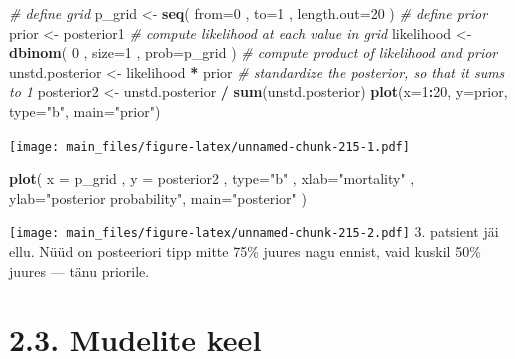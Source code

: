 \documentclass[]{book}
\newenvironment{Shaded}{\begin{snugshade}}{\end{snugshade}}
\newcommand{\KeywordTok}[1]{\textcolor[rgb]{0.13,0.29,0.53}{\textbf{#1}}}
\newcommand{\DataTypeTok}[1]{\textcolor[rgb]{0.13,0.29,0.53}{#1}}
\newcommand{\DecValTok}[1]{\textcolor[rgb]{0.00,0.00,0.81}{#1}}
\newcommand{\StringTok}[1]{\textcolor[rgb]{0.31,0.60,0.02}{#1}}
\newcommand{\CommentTok}[1]{\textcolor[rgb]{0.56,0.35,0.01}{\textit{#1}}}
\newcommand{\OperatorTok}[1]{\textcolor[rgb]{0.81,0.36,0.00}{\textbf{#1}}}
\newcommand{\NormalTok}[1]{#1}
\begin{document}
\begin{Shaded}
\begin{Highlighting}[]
\CommentTok{# define grid}
\NormalTok{p_grid <-}\StringTok{ }\KeywordTok{seq}\NormalTok{( }\DataTypeTok{from=}\DecValTok{0}\NormalTok{ , }\DataTypeTok{to=}\DecValTok{1}\NormalTok{ , }\DataTypeTok{length.out=}\DecValTok{20}\NormalTok{ )}
\CommentTok{# define prior}
\NormalTok{prior <-}\StringTok{ }\NormalTok{posterior1}
\CommentTok{# compute likelihood at each value in grid}
\NormalTok{likelihood <-}\StringTok{ }\KeywordTok{dbinom}\NormalTok{( }\DecValTok{0}\NormalTok{ , }\DataTypeTok{size=}\DecValTok{1}\NormalTok{ , }\DataTypeTok{prob=}\NormalTok{p_grid )}
\CommentTok{# compute product of likelihood and prior}
\NormalTok{unstd.posterior <-}\StringTok{ }\NormalTok{likelihood }\OperatorTok{*}\StringTok{ }\NormalTok{prior}
\CommentTok{# standardize the posterior, so that it sums to 1}
\NormalTok{posterior2 <-}\StringTok{ }\NormalTok{unstd.posterior }\OperatorTok{/}\StringTok{ }\KeywordTok{sum}\NormalTok{(unstd.posterior)}
\KeywordTok{plot}\NormalTok{(}\DataTypeTok{x=}\DecValTok{1}\OperatorTok{:}\DecValTok{20}\NormalTok{, }\DataTypeTok{y=}\NormalTok{prior, }\DataTypeTok{type=}\StringTok{"b"}\NormalTok{, }\DataTypeTok{main=}\StringTok{"prior"}\NormalTok{)}
\end{Highlighting}
\end{Shaded}

\texttt{[image: main\_files/figure-latex/unnamed-chunk-215-1.pdf]}

\begin{Shaded}
\begin{Highlighting}[]
\KeywordTok{plot}\NormalTok{( }\DataTypeTok{x =}\NormalTok{ p_grid , }\DataTypeTok{y =}\NormalTok{ posterior2 , }\DataTypeTok{type=}\StringTok{"b"}\NormalTok{ ,}
    \DataTypeTok{xlab=}\StringTok{"mortality"}\NormalTok{ , }\DataTypeTok{ylab=}\StringTok{"posterior probability"}\NormalTok{, }\DataTypeTok{main=}\StringTok{"posterior"}\NormalTok{  )}
\end{Highlighting}
\end{Shaded}

\texttt{[image: main\_files/figure-latex/unnamed-chunk-215-2.pdf]} 3.
patsient jäi ellu. Nüüd on posteeriori tipp mitte 75\% juures nagu
ennist, vaid kuskil 50\% juures --- tänu priorile.

\section{2.3. Mudelite keel}\label{mudelite-keel}
\end{document}
